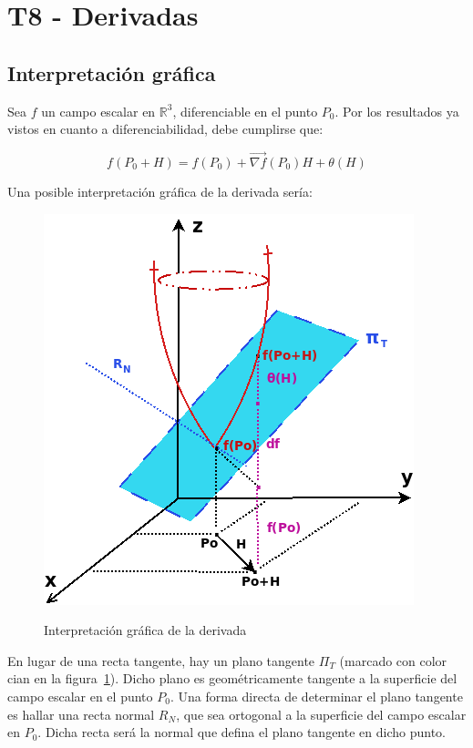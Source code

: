 \documentclass{article}
\renewcommand{\Bbb}{\mathbb}
\begin{document}
\section{T8 - Derivadas}

\subsection{Interpretación gráfica}

Sea $f$ un campo escalar en $\Bbb R^3$, diferenciable en el punto $P_0$. Por los resultados ya vistos en cuanto a diferenciabilidad, debe cumplirse que:

\begin{equation}
f(P_0 + H) = f(P_0) + \overrightarrow{\nabla{f}}(P_0) H + \theta(H)
\end{equation}

Una posible interpretación gráfica de la derivada sería:

\begin{figure}[h]
\caption{Interpretación gráfica de la derivada}
\centering
\includegraphics[scale=0.6]{img/teo_fig006_dg.png} 
\label{fig:deriv_graf}
\end{figure}

En lugar de una recta tangente, hay un plano tangente $\Pi_T$ (marcado con color cian en la figura~\ref{fig:deriv_graf}). Dicho plano es geométricamente tangente a la superficie del campo escalar en el punto $P_0$. Una forma directa de determinar el plano tangente es hallar una recta normal $R_N$, que sea ortogonal a la superficie del campo escalar en $P_0$. Dicha recta será la normal que defina el plano tangente en dicho punto.
\end{document}
